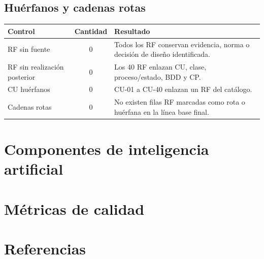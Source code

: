 \documentclass[11pt,a4paper]{article}
\begin{document}
\subsection{Huérfanos y cadenas rotas}
\begin{tabularx}{\textwidth}{|p{4.8cm}|c|Y|}
\hline
\textbf{Control} & \textbf{Cantidad} & \textbf{Resultado}\\\hline
RF sin fuente & 0 & Todos los RF conservan evidencia, norma o decisión de diseño identificada.\\\hline
RF sin realización posterior & 0 & Los 40 RF enlazan CU, clase, proceso/estado, BDD y CP.\\\hline
CU huérfanos & 0 & CU-01 a CU-40 enlazan un RF del catálogo.\\\hline
Cadenas rotas & 0 & No existen filas RF marcadas como rota o huérfana en la línea base final.\\\hline
\end{tabularx}

\section{Componentes de inteligencia artificial}


\section{Métricas de calidad}


\section{Referencias}
\end{document}
